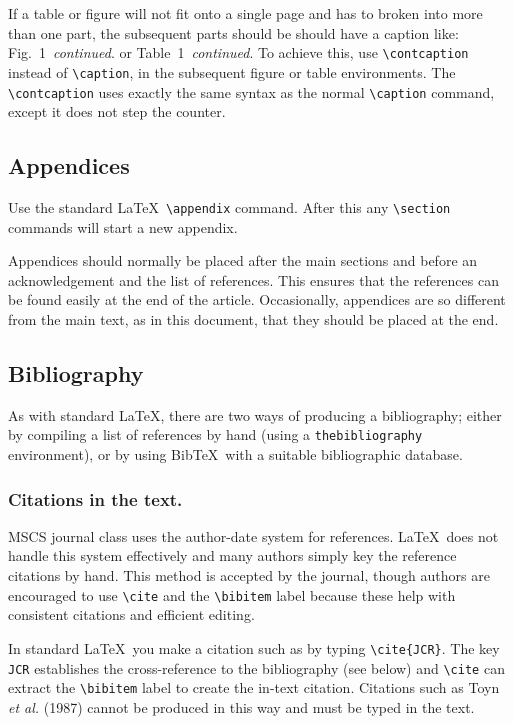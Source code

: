 \documentclass{mscs}
\begin{document}
If a table or figure will not fit onto a single page and has to broken into
more than one part, the subsequent parts should be should have a caption like:
\hbox{Fig. 1 \textit{continued}.} or \hbox{Table 1 \textit{continued}.} To achieve
this, use \verb"\contcaption" instead of \verb"\caption", in the subsequent
figure or table environments.  The \verb"\contcaption" uses exactly the same
syntax as the normal \verb"\caption" command, except it does not step
the counter.

\subsection{Appendices}

Use the standard \LaTeX\ \verb"\appendix" command. After this any
\verb"\section" commands will start a new appendix.

Appendices should normally be placed after the main sections
and before an acknowledgement and the list of references. This ensures
that the references can be found easily at the end of the article.
Occasionally, appendices are so different from the main text, as in
this document, that they should be placed at the end.

\subsection{Bibliography}

As with standard \LaTeX, there are two ways of producing
a bibliography; either by compiling a list of references
by hand (using a \verb"thebibliography" environment), or
by using Bib\TeX\ with a suitable bibliographic database.

\subsubsection{Citations in the text.}

MSCS journal class uses the author-date system for
references. \LaTeX\ does not handle this system
effectively and many authors simply key the reference
citations by hand. This method is
accepted by the journal, though authors are encouraged to
use \verb"\cite" and the \verb"\bibitem" label because these
help with consistent citations and efficient editing.

In standard \LaTeX\ you make a citation such as
\cite{JCR} by typing \verb"\cite{JCR}". The key \verb"JCR"
establishes the cross-reference to the bibliography (see below)
and \verb"\cite" can extract the \verb"\bibitem" label to create
the in-text citation. Citations such as Toyn \linebreak \emph{et al.}
(1987) cannot be produced in this way and must be typed in the text.
\end{document}
